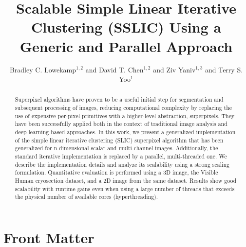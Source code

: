 \documentclass{InsightArticle}
\title{Scalable Simple Linear Iterative Clustering (SSLIC) Using a
  Generic and Parallel Approach}
\author{Bradley C. Lowekamp$^{1,2}$ and David T. Chen$^{1,2}$ and Ziv Yaniv$^{1,3}$ and Terry S. Yoo$^{1}$}
\newcommand{\IJhandlerIDnumber}{999}
\begin{document}
%
%
\IJhandlefooter{\IJhandlerIDnumber}


\ifpdf
\else
\fi


\maketitle


\ifhtml
\chapter*{Front Matter\label{front}}
\fi


\begin{abstract}
\noindent
Superpixel algorithms have proven to be a useful initial step for
segmentation and subsequent processing of images, reducing computational complexity 
by replacing the use of expensive per-pixel primitives with a higher-level abstraction, superpixels. 
They have been successfully applied both in the context of traditional image analysis and deep learning
based approaches. In this work, we present a generalized implementation of the simple linear iterative clustering
(SLIC) superpixel algorithm that has been generalized for n-dimensional
scalar and multi-channel images. Additionally, the standard iterative implementation
is replaced by a parallel, multi-threaded one. We describe the implementation
details and analyze its scalability using a strong scaling formulation. Quantitative evaluation 
is performed using a 3D image, the Visible Human cryosection dataset, and a 2D image
from the same dataset. Results show  good scalability with runtime gains even when using
a large number of threads that exceeds the physical number of available cores (hyperthreading).
\end{abstract}

\IJhandlenote{\IJhandlerIDnumber}
\end{document}
